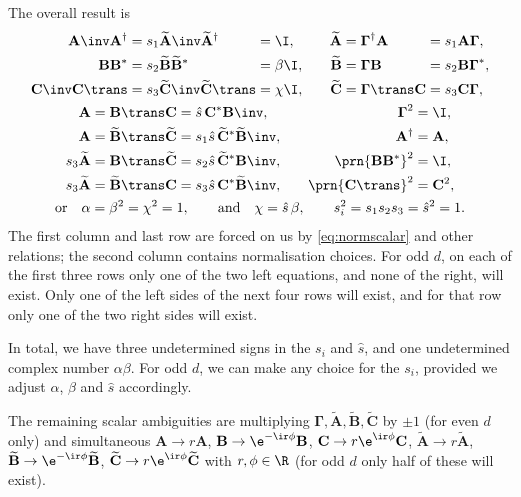 \documentclass[11pt]{article}
\newcommand{\cc}{^\ast}
\newcommand{\hc}{^\dag}
\newcommand{\Gammab}{\boldsymbol{\Gamma}}
\newcommand{\A}{\mathbf{A}}
\newcommand{\B}{\mathbf{B}}
\renewcommand{\C}{\mathbf{C}}
\newcommand{\At}{\widetilde{\A}}
\newcommand{\Bt}{\widetilde{\B}}
\newcommand{\Ct}{\widetilde{\C}}
\newcommand{\sh}{\hat{s}}
\begin{document}
The overall result is
%
\begin{equation}\label{eq:constnorm}
\begin{gathered}
\begin{alignedat}{4}
  \A\inv \A\hc &= s_1 \At\inv \At\hc &
        &= \I, &
    \At &= \Gammab\hc \A &
        &= s_1 \A \Gammab,
  \\
  \B \B\cc &= s_2 \Bt \Bt\cc &
        &= \beta \I, &
    \Bt &= \Gammab \B &
        &= s_2 \B \Gammab\cc,
  \\
  \C\inv \C\trans &= s_3 \Ct\inv \Ct\trans &
        &= \chi \I, &\qquad
    \Ct &= \Gammab\trans \C &
        &= s_3 \C \Gammab,
  \\
\end{alignedat}
\\
\begin{alignedat}{3}
  \A &= \B\trans \C &
        &= \sh\, \C\cc \B\inv, &\qquad
    \Gammab^2 &= \I,
  \\
  \A &= \Bt\trans \Ct &
        &= s_1 \sh\, \Ct\cc \Bt\inv, &\qquad
    \A\hc &= \A,
  \\
  s_3 \At &= \B\trans \Ct &
        &= s_2 \sh\, \Ct\cc \B\inv, &\qquad
    \prn{\B \B\cc}^2 &= \I,
  \\
  s_3 \At &= \Bt\trans \C &
        &= s_3 \sh\, \C\cc \Bt\inv, &\qquad
    \prn{\C\trans}^2 &= \C^2,
\end{alignedat}
\\
  \text{or}\quad
  \alpha = \beta^2 = \chi^2 = 1 , \qquad 
  \text{and} \quad
  \chi = \sh\, \beta, \qquad
  s_i^2 = s_1 s_2 s_3 = \sh^2 = 1.
\end{gathered}
\end{equation}
%
The first column and last row are forced on us by \cref{eq:normscalar} and other relations; the second column contains normalisation choices.
For odd \(d\), on each of the first three rows only one of the two left equations, and none of the right, will exist.
Only one of the left sides of the next four rows will exist, and for that row only one of the two right sides will exist.

In total, we have three undetermined signs in the \(s_i\) and \(\sh\), and one undetermined complex number \(\alpha \beta\).
For odd \(d\), we can make any choice for the \(s_i\), provided we adjust \(\alpha\), \(\beta\) and \(\sh\) accordingly.

The remaining scalar ambiguities are multiplying \(\Gammab,\At,\Bt,\Ct\) by \(\pm1\) (for even \(d\) only)
and simultaneous \( \A \rightarrow r \A \),
\( \B \rightarrow \e^{-\ir\phi} \B \), \( \C \rightarrow r\e^{\ir\phi} \C \),
\( \At \rightarrow r \At \), \( \Bt \rightarrow \e^{-\ir\phi} \Bt \),
\( \Ct \rightarrow r\e^{\ir\phi} \Ct \) with \( r, \phi \in \R \) (for odd \(d\) only half of these will exist).
\end{document}
